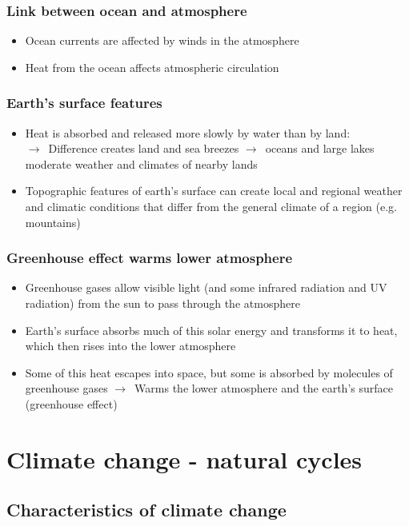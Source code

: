 \documentclass{article}
\begin{document}
\subsubsection{Link between ocean and atmosphere}
\begin{itemize}
    \item Ocean currents are affected by winds in the atmosphere
    \item Heat from the ocean affects atmospheric circulation
\end{itemize}

\subsubsection{Earth's surface features}
\begin{itemize}
    \item Heat is absorbed and released more slowly by water than by land:\\
    $\to$\ Difference creates land and sea breezes $\to$\ oceans and large lakes moderate weather and climates of nearby lands
    \item Topographic features of earth’s surface can create local and regional weather and climatic conditions that differ from the general climate of a region (e.g. mountains)
\end{itemize}

\subsubsection{Greenhouse effect warms lower atmosphere}
\begin{itemize}
    \item Greenhouse gases allow visible light (and some infrared radiation and UV radiation) from the sun to pass through the atmosphere
    \item Earth’s surface absorbs much of this solar energy and transforms it to heat, which then rises into the lower atmosphere
    \item Some of this heat escapes into space, but some is absorbed by molecules of greenhouse gases $\to$\ Warms the lower atmosphere and the earth’s surface (greenhouse effect)
\end{itemize}

\section{Climate change - natural cycles}
\subsection{Characteristics of climate change}
\end{document}
